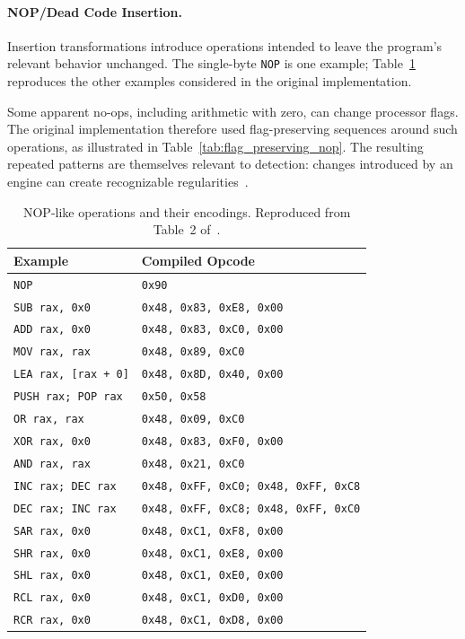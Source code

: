 \documentclass[runningheads]{llncs}
\begin{document}
\paragraph{NOP/Dead Code Insertion.}
Insertion transformations introduce operations intended to leave the program's relevant behavior unchanged. The single-byte \texttt{NOP} is one example; Table~\ref{tab:nop_instructions} reproduces the other examples considered in the original implementation.

Some apparent no-ops, including arithmetic with zero, can change processor flags. The original implementation therefore used flag-preserving sequences around such operations, as illustrated in Table~\ref{tab:flag_preserving_nop}. The resulting repeated patterns are themselves relevant to detection: changes introduced by an engine can create recognizable regularities~\cite{pushfmeth}.

\begin{table}[t]
    \caption{NOP-like operations and their encodings. Reproduced from Table~2 of~\cite{zone_secrypt_2026}.}
    \label{tab:nop_instructions}
    \small
    \centering
    \setlength{\tabcolsep}{3pt}
    \begin{tabular}{ll}
        \hline
        \textbf{Example} & \textbf{Compiled Opcode} \\ \hline
        \verb|NOP| & \verb|0x90| \\ \hline
        \verb|SUB rax, 0x0| & \verb|0x48, 0x83, 0xE8, 0x00| \\ \hline
        \verb|ADD rax, 0x0| & \verb|0x48, 0x83, 0xC0, 0x00| \\ \hline
        \verb|MOV rax, rax| & \verb|0x48, 0x89, 0xC0| \\ \hline
        \verb|LEA rax, [rax + 0]| & \verb|0x48, 0x8D, 0x40, 0x00| \\ \hline
        \verb|PUSH rax; POP rax| & \verb|0x50, 0x58| \\ \hline
        \verb|OR rax, rax| & \verb|0x48, 0x09, 0xC0| \\ \hline
        \verb|XOR rax, 0x0| & \verb|0x48, 0x83, 0xF0, 0x00| \\ \hline
        \verb|AND rax, rax| & \verb|0x48, 0x21, 0xC0| \\ \hline
        \verb|INC rax; DEC rax| & \verb|0x48, 0xFF, 0xC0; 0x48, 0xFF, 0xC8| \\ \hline
        \verb|DEC rax; INC rax| & \verb|0x48, 0xFF, 0xC8; 0x48, 0xFF, 0xC0| \\ \hline
        \verb|SAR rax, 0x0| & \verb|0x48, 0xC1, 0xF8, 0x00| \\ \hline
        \verb|SHR rax, 0x0| & \verb|0x48, 0xC1, 0xE8, 0x00| \\ \hline
        \verb|SHL rax, 0x0| & \verb|0x48, 0xC1, 0xE0, 0x00| \\ \hline
        \verb|RCL rax, 0x0| & \verb|0x48, 0xC1, 0xD0, 0x00| \\ \hline
        \verb|RCR rax, 0x0| & \verb|0x48, 0xC1, 0xD8, 0x00| \\ \hline
    \end{tabular}
\end{table}
\end{document}
